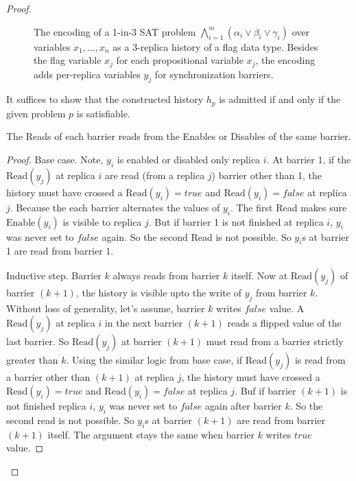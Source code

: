 \begin{proof}
  \begin{figure}[t]
    \centering
    {\scriptsize}
         \vspace{-1mm}
    \caption{The encoding of a 1-in-3 SAT problem $\bigwedge_{i=1}^{m} (\alpha_i \lor \beta_i \lor \gamma_i)$ over variables $x_1, \ldots, x_n$ as a 3-replica history of a flag data type. Besides the flag variable $x_j$ for each propositional variable $x_j$, the encoding adds per-replica variables $y_j$ for synchronization barriers.}
    \label{fig:3sat-to-flags}
    \vspace{-4mm}
  \end{figure}

  It suffices to show that the constructed history $h_p$ is admitted if and only if the given problem $p$ is satisfiable.

  \begin{lemma}
    \label{crdt:flag:npc-proof:lemma1}
    The \textrm{Read}s of each barrier reads from the \textrm{Enable}s or \textrm{Disable}s of the same barrier. 
  \end{lemma}

  \begin{proof}
    Base case. Note, $y_i$ is enabled or disabled only replica $i$. At barrier 1, if the $\mathrm{Read}(y_j)$ at replica $i$ are read (from a replica $j$) barrier other than 1, the history must have crossed a $\mathrm{Read}(y_i) = true$ and $\mathrm{Read}(y_i) = false$ at replica $j$. Because the each barrier alternates the values of $y_i$. The first \textrm{Read} makes sure $\mathrm{Enable}(y_i)$ is visible to replica $j$. But if barrier 1 is not finished at replica $i$, $y_i$ was never set to $false$ again. So the second \textrm{Read} is not possible. So $y_i$s at barrier 1 are read from barrier 1.
    
    Inductive step. Barrier $k$ always reads from barrier $k$ itself. Now at $\mathrm{Read}(y_j)$ of barrier $(k+1)$, the history is visible upto the write of $y_j$ from barrier $k$. Without loss of generality, let's assume, barrier $k$ writes $false$ value. A $\mathrm{Read}(y_j)$ at replica $i$ in the next barrier $(k+1)$ reads a flipped value of the last barrier. So $\mathrm{Read}(y_j)$ at barrier $(k+1)$ must read from a barrier strictly greater than $k$. Using the similar logic from base case, if $\mathrm{Read}(y_j)$ is read from a barrier other than $(k+1)$ at replica $j$, the history must have crossed a $\mathrm{Read}(y_i) = true$ and $\mathrm{Read}(y_i) = false$ at replica $j$. Buf if barrier $(k+1)$ is not finished replica $i$, $y_i$ was never set to $false$ again after barrier $k$. So the second read is not possible. So $y_i$s at barrier $(k+1)$ are read from barrier $(k+1)$ itself. The argument stays the same when barrier $k$ writes $true$ value.
  \end{proof}


\end{proof}
